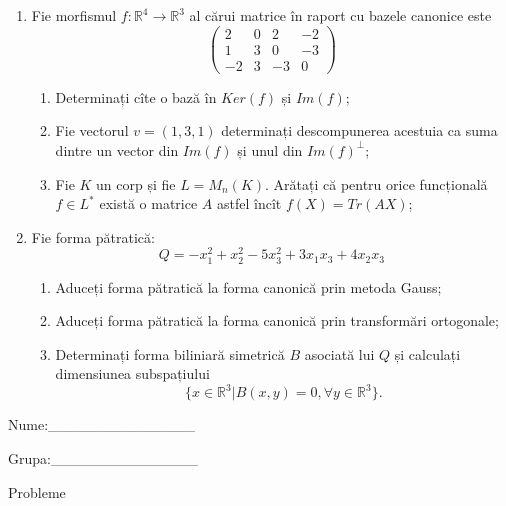 \documentclass{article}
\begin{document}
\begin{enumerate}
 \item Fie morfismul $f:\mathbb{R}^4 \to \mathbb{R}^3$ al cărui matrice în raport cu bazele canonice este
$$\begin{pmatrix}
2&0&2&-2\\
1&3&0&-3\\
-2&3&-3&0
\end{pmatrix}$$

\begin{enumerate}
\item Determinați cîte o bază în $Ker(f)$ și $Im(f)$;
\item Fie vectorul $v=(1,3,1)$ determinați descompunerea acestuia ca suma dintre un vector din $Im(f)$ și unul din $Im(f)^\perp$;
\item Fie $K$ un corp și fie $L=M_n(K)$. Arătați că pentru orice funcțională $f \in L^*$ există o matrice $A$ astfel încît $f(X)=Tr(AX)$;
\end{enumerate}
\item Fie forma pătratică:
$$Q= -x_1^2+x_2^2-5x_3^2+3x_1x_3+4x_2x_3$$

\begin{enumerate}
\item Aduceți forma pătratică la forma canonică prin metoda Gauss;
\item Aduceți forma pătratică la forma canonică prin transformări ortogonale;
\item Determinați forma biliniară simetrică $B$ asociată lui $Q$ și calculați dimensiunea subspațiului
$$\{x \in \mathbb{R}^3 | B(x,y)=0,\forall y \in \mathbb{R}^3\}.$$

\end{enumerate}
\end{enumerate}
\newpage
\begin{flushright}
Nume:\_\_\_\_\_\_\_\_\_\_\_\_\_\_
 
 
Grupa:\_\_\_\_\_\_\_\_\_\_\_\_\_\_
\end{flushright}
\begin{center}
\vspace{2cm}
{\Large Probleme}
\vspace{2cm}
\end{center}
\end{document}
